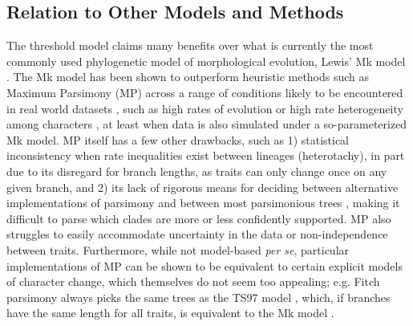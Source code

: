 \subsection{Relation to Other Models and Methods}

The threshold model claims many benefits over what is currently the most commonly used phylogenetic model of morphological evolution, Lewis’ Mk model \citep{lewisLikelihoodApproachEstimating2001}. The Mk model has been shown to outperform heuristic methods such as Maximum Parsimony (MP) across a range of conditions likely to be encountered in real world datasets \citep{wrightBayesianAnalysisUsing2014, wrightModelingCharacterChange2016}, such as high rates of evolution or high rate heterogeneity among characters \citep{wagnerModellingRateDistributions2012}, at least when data is also simulated under a so-parameterized Mk model. MP itself has a few other drawbacks, such as 1) statistical inconsistency when rate inequalities exist between lineages (heterotachy), in part due to its disregard for branch lengths, as traits can only change once on any given branch, and 2) its lack of rigorous means for deciding between alternative implementations of parsimony and between most parsimonious trees \citep{felsensteinInferringPhylogenies2004}, making it difficult to parse which clades are more or less confidently supported. MP also struggles to easily accommodate uncertainty in the data or non-independence between traits. Furthermore, while not model-based \textit{per se}, particular implementations of MP can be shown to be equivalent to certain explicit models of character change, which themselves do not seem too appealing; e.g. Fitch parsimony \citep{fitchDefiningCourseEvolution1971} always picks the same trees as the TS97 model \citep{tuffleyLinksMaximumLikelihood1997}, which, if branches have the same length for all traits, is equivalent to the Mk model \citep{lewisLikelihoodApproachEstimating2001, steelParsimonyLikelihoodRole2000}. 

